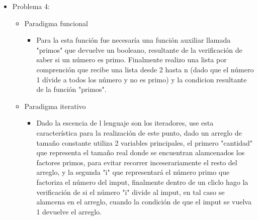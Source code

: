 \documentclass[10pt]{article}
\begin{document}
\begin{titlepage}
\begin{flushleft}
\begin{itemize}
			\item Problema 4:
			\begin{itemize}
				\item Paradigma funcional
				\begin{itemize}
					\item Para la esta función fue necesaría una función auxiliar llamada "primos" que devuelve un booleano, resultante de la verificación de saber si un número es primo. Finalmente realizo una lista por comprención que recibe una lista desde 2 hasta n (dado que el número 1 dívide a todos los número y no es primo) y la condicion resultante de la función "primos".
				\end{itemize}
				\item Paradigma iterativo
				\begin{itemize}
					\item Dado la escencia de l lenguaje son los iteradores, use esta característica para la realización de este punto, dado un arreglo de tamaño constante utiliza 2 variables principales, el primero "cantidad" que representa el tamaño real donde se encuentran alamcenados los factores primos, para evitar recorrer inceserariamente el resto del arreglo, y la segunda "i" que representará el número primo que factoriza el número del imput, finalmente dentro de un cliclo hago la verificación de si el número "i" divide al imput, en tal caso se alamcena en el arreglo, cuando la condición de que el imput se vuelva 1 devuelve el arreglo.
				\end{itemize}
			\end{itemize}
		\end{itemize}
	\end{flushleft}
\end{titlepage}
\end{document}
